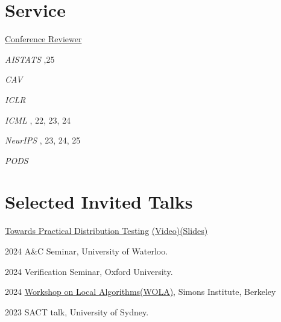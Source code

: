 \documentclass[12pt,letterpaper]{report}
\begin{document}
	
	
	\section*{Service}
	\underline{Conference Reviewer }
	\vspace{1em}
	\begin{tablist}
		\item[\textit{AISTATS}] ,25
		\item[\textit{CAV}]         
		\item[\textit{ICLR}] 
		\item[\textit{ICML}], 22, 23, 24
		\item[\textit{NeurIPS}] , 23, 24, 25 
		\item[\textit{PODS}] 
	\end{tablist}
	
	\section*{Selected Invited Talks}
	\begin{tablist}
		\item[\underline{Towards Practical Distribution Testing}   \href{https://www.youtube.com/live/LexsPa-iGA4?si=b_wZrOyOpPlYB9VR}{(Video)}\href{https://simons.berkeley.edu/sites/default/files/2024-08/Yash\%20Pote_WOLA\%20Slides.pdf}{(Slides)}] 
		
		
		\item[2024] A\&C Seminar, University of Waterloo.
		
		\item[2024]    Verification Seminar, Oxford University.
		
		\item[2024]    \href{https://simons.berkeley.edu/workshops/workshop-local-algorithms-wola}{Workshop on Local Algorithms(WOLA)}, Simons Institute, Berkeley  
		
		\item[2023]    SACT talk, University of Sydney. 
		
	\end{tablist}
	
\end{document}
